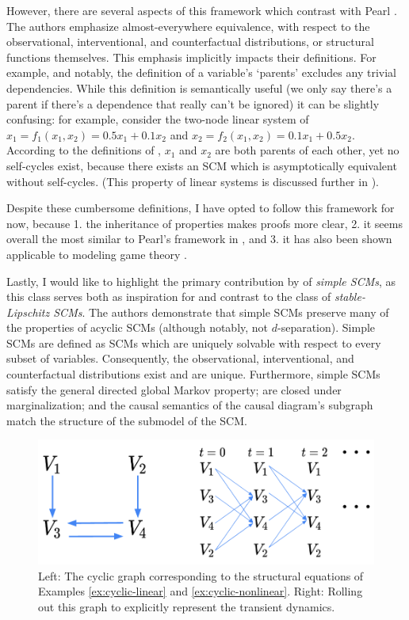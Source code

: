 \documentclass[letterpaper,10pt]{article}
\begin{document}
However, there are several aspects of this framework which contrast with Pearl \cite{pearl_2009}.
The authors emphasize almost-everywhere equivalence, with respect to the observational, interventional, and counterfactual distributions, or structural functions themselves. This emphasis implicitly impacts their definitions. For example, and notably, the definition of a variable's `parents' excludes any trivial dependencies. While this definition is semantically useful (we only say there's a parent if there's a dependence that really can't be ignored) it can be slightly confusing: for example, consider the two-node linear system of $x_1 = f_1(x_1,x_2)=0.5x_1+0.1x_2$ and $x_2 = f_2(x_1,x_2)=0.1x_1+0.5x_2$. According to the definitions of \cite{Foundations}, $x_1$ and $x_2$ are both parents of each other, yet no self-cycles exist, because there exists an SCM which is asymptotically equivalent without self-cycles. (This property of linear systems is discussed further in \cite{LearningLinear}).

Despite these cumbersome definitions, I have opted to follow this framework for now, because 1. the inheritance of properties makes proofs more clear, 2. it seems overall the most similar to Pearl's framework in \cite{pearl_2009}, and 3. it has also been shown applicable to modeling game theory \cite{CausalGames}.

Lastly, I would like to highlight the primary contribution by \cite{Foundations} of \emph{simple SCMs}, as this class serves both as inspiration for and contrast to the class of \emph{stable-Lipschitz SCMs}.
The authors demonstrate that simple SCMs preserve many of the properties of acyclic SCMs (although notably, not $d$-separation). Simple SCMs are defined as SCMs which are uniquely solvable with respect to every subset of variables. Consequently, the observational, interventional, and counterfactual distributions exist and are unique. Furthermore, simple SCMs satisfy the general directed global Markov property; are closed under marginalization; and the causal semantics of the causal diagram's subgraph match the structure of the submodel of the SCM.

\begin{figure}
\centering
\includegraphics[width=.5\linewidth]{pics/my_own/rolled_out.png}
\caption{Left: The cyclic graph corresponding to the structural equations of Examples \ref{ex:cyclic-linear} and \ref{ex:cyclic-nonlinear}. Right: Rolling out this graph to explicitly represent the transient dynamics.}
\label{fig:rolled-out}
\end{figure}
\end{document}

